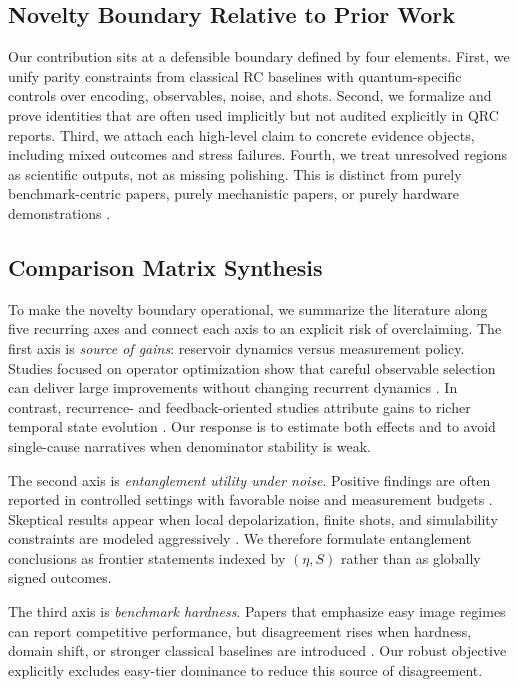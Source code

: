 \documentclass{article} %
\begin{document}
\subsection{Novelty Boundary Relative to Prior Work}
Our contribution sits at a defensible boundary defined by four elements. First, we unify parity constraints from classical RC baselines with quantum-specific controls over encoding, observables, noise, and shots. Second, we formalize and prove identities that are often used implicitly but not audited explicitly in QRC reports. Third, we attach each high-level claim to concrete evidence objects, including mixed outcomes and stress failures. Fourth, we treat unresolved regions as scientific outputs, not as missing polishing. This is distinct from purely benchmark-centric papers, purely mechanistic papers, or purely hardware demonstrations \citep{arxiv_2407_02553,arxiv_2310_06706,arxiv_2602_00610,arxiv_2603_17182,arxiv_2602_21544,arxiv_2602_13094}.


\subsection{Comparison Matrix Synthesis}
To make the novelty boundary operational, we summarize the literature along five recurring axes and connect each axis to an explicit risk of overclaiming. The first axis is \emph{source of gains}: reservoir dynamics versus measurement policy. Studies focused on operator optimization show that careful observable selection can deliver large improvements without changing recurrent dynamics \citep{arxiv_2602_14677,arxiv_2602_18377}. In contrast, recurrence- and feedback-oriented studies attribute gains to richer temporal state evolution \citep{arxiv_2503_17939,arxiv_2503_22380,arxiv_2602_17440}. Our response is to estimate both effects and to avoid single-cause narratives when denominator stability is weak.

The second axis is \emph{entanglement utility under noise}. Positive findings are often reported in controlled settings with favorable noise and measurement budgets \citep{arxiv_2403_08998,arxiv_2209_05142}. Skeptical results appear when local depolarization, finite shots, and simulability constraints are modeled aggressively \citep{arxiv_2509_06873,arxiv_2601_23084}. We therefore formulate entanglement conclusions as frontier statements indexed by $(\eta,S)$ rather than as globally signed outcomes.

The third axis is \emph{benchmark hardness}. Papers that emphasize easy image regimes can report competitive performance, but disagreement rises when hardness, domain shift, or stronger classical baselines are introduced \citep{arxiv_2409_00998,arxiv_2212_08693,arxiv_2412_06758,arxiv_2601_22194}. Our robust objective explicitly excludes easy-tier dominance to reduce this source of disagreement.
\end{document}
